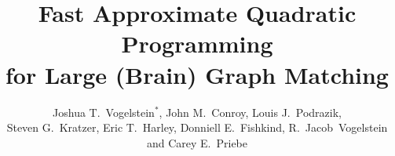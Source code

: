 \documentclass[preprint,11pt]{elsarticle}
\begin{document}
	\begin{frontmatter}


\title{Fast Approximate Quadratic Programming \\ for Large (Brain) Graph Matching}
\author{Joshua T.~Vogelstein$^*$, John M.~Conroy, Louis J.~Podrazik, \\ Steven G.~Kratzer, Eric T.~Harley, 
        Donniell E.~Fishkind, 
		R.~Jacob~Vogelstein
        and Carey E.~Priebe}

\address{		J.T. Vogelstein, E.T. Harley, D.E. Fishkind, and C.E. Priebe are with the Department of Applied Mathematics and Statistics, Johns Hopkins University, Baltimore, MD 21218. 
\\ J.M. Conroy, L.J. Podrazik and S.G. Kratzer are with Institute for Defense Analyses, Center for Computing Sciences, Bowie, MD 20708. 
\\ R.J. Vogelstein is with the Johns Hopkins University Applied Physics Laboratory, Laurel, MD, 20723. \\ $^*$ corresponding author; current address: Department of Statistical Science, Duke University, Durham, NC 27708.}

 

\end{frontmatter}
\end{document}
